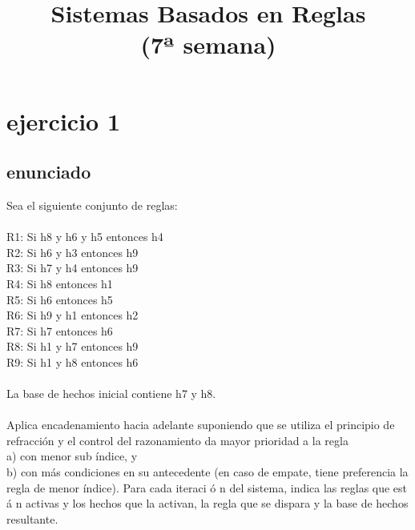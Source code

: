 \documentclass[a4paper,10pt]{article}
\title{Sistemas Basados en Reglas\\(7ª semana)}
\begin{document}
\maketitle
\pagebreak
\tableofcontents
\pagebreak

\section{ejercicio 1}
\subsection{enunciado}
Sea el siguiente conjunto de reglas:\\
\vspace{0.5cm}\\
R1: Si h8 y h6 y h5 entonces h4 \\
R2: Si h6 y h3 entonces h9 \\
R3: Si h7 y h4 entonces h9 \\
R4: Si h8 entonces h1 \\
R5: Si h6 entonces h5 \\
R6: Si h9 y h1 entonces h2 \\
R7: Si h7 entonces h6 \\
R8: Si h1 y h7 entonces h9 \\
R9: Si h1 y h8 entonces h6 \\
\vspace{0.5cm}\\
La base de hechos inicial contiene h7 y h8. \\
\vspace{0.5cm}\\
Aplica encadenamiento hacia adelante suponiendo que se utiliza el principio de refracción y el control del razonamiento da mayor prioridad a la regla\\
a) con menor sub índice, y\\
b) con más condiciones en su antecedente (en caso de empate, tiene preferencia la regla de menor índice). Para cada iteraci ó n del sistema, indica las reglas que est á n activas y los hechos que la activan, la regla que se dispara y la base de hechos resultante.
\end{document}
